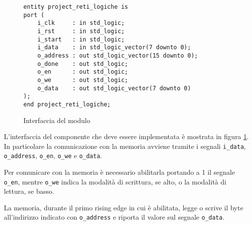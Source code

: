 \begin{figure}[!ht]
    \centering
    \begin{varwidth}{\linewidth}
        \begin{verbatim}
entity project_reti_logiche is
port (
    i_clk     : in std_logic;
    i_rst     : in std_logic;
    i_start   : in std_logic;
    i_data    : in std_logic_vector(7 downto 0);
    o_address : out std_logic_vector(15 downto 0);
    o_done    : out std_logic;
    o_en      : out std_logic;
    o_we      : out std_logic;
    o_data    : out std_logic_vector(7 downto 0)
);
end project_reti_logiche;
    \end{verbatim}
    \end{varwidth}
    \caption{Interfaccia del modulo}
    \label{code:interfacciacomponente}
\end{figure}

L'interfaccia del componente che deve essere implementata è mostrata in figura \ref{code:interfacciacomponente}. In particolare la comunicazione con la memoria avviene tramite i segnali \verb|i_data|, \verb|o_address|, \verb|o_en|, \verb|o_we| e \verb|o_data|.

Per comunicare con la memoria è necessario abilitarla portando a 1 il segnale \verb|o_en|, mentre \verb|o_we| indica la modalità di scrittura, se alto, o la modalità di lettura, se basso.

La memoria, durante il primo rising edge in cui è abilitata, legge o scrive il byte all'indirizzo indicato con \verb|o_address| e riporta il valore sul segnale \verb|o_data|.